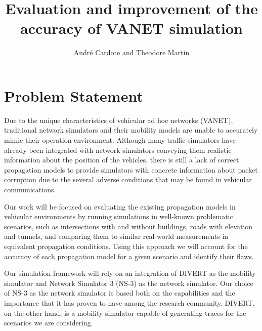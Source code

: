 \documentclass[11pt,letter]{article}
\title{Evaluation and improvement of the accuracy of VANET simulation}
\author{\small Andr\'e Cardote and Theodore Martin}
\date{}
\begin{document}
  \maketitle 
\vspace{-5ex}
\section{Problem Statement}

Due to the unique characteristics of vehicular ad hoc networks (VANET), traditional network simulators and their mobility models are unable to accurately mimic their operation environment. Although many traffic simulators have already been integrated with network simulators conveying them realistic information about the position of the vehicles, there is still a lack of correct propagation models to provide simulators with concrete information about packet corruption due to the several adverse conditions that may be found in vehicular communications.

Our work will be focused on evaluating the existing propagation models in vehicular environments by running simulations in well-known problematic scenarios, such as intersections with and without buildings, roads with elevation and tunnels, and comparing them to similar real-world measurements in equivalent propagation conditions. Using this approach we will account for the accuracy of each propagation model for a given scenario and identify their flaws.

Our simulation framework will rely on an integration of DIVERT \cite{Conceicao:2008p1397} as the mobility simulator and Network Simulator 3 (NS-3) \cite{NS3} as the network simulator. Our choice of NS-3 as the network simulator is based both on the capabilities and the importance that it has proven to have among the research community. DIVERT, on the other hand, is a mobility simulator capable of generating traces for the scenarios we are considering.
\end{document}
